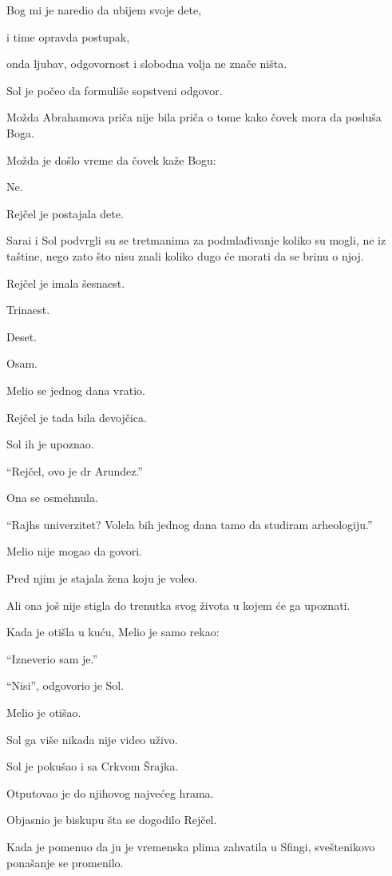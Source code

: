 Bog mi je naredio da ubijem svoje dete,

i time opravda postupak,

onda ljubav, odgovornost i slobodna volja ne znače ništa.

Sol je počeo da formuliše sopstveni odgovor.

Možda Abrahamova priča nije bila priča o tome kako čovek mora da posluša Boga.

Možda je došlo vreme da čovek kaže Bogu:

Ne.

\bigskip

Rejčel je postajala dete.

Sarai i Sol podvrgli su se tretmanima za podmlađivanje koliko su mogli, ne iz taštine, nego zato što nisu znali koliko dugo će morati da se brinu o njoj.

Rejčel je imala šesnaest.

Trinaest.

Deset.

Osam.

Melio se jednog dana vratio.

Rejčel je tada bila devojčica.

Sol ih je upoznao.

``Rejčel, ovo je dr Arundez.''

Ona se osmehnula.

``Rajhs univerzitet? Volela bih jednog dana tamo da studiram arheologiju.''

Melio nije mogao da govori.

Pred njim je stajala žena koju je voleo.

Ali ona još nije stigla do trenutka svog života u kojem će ga upoznati.

Kada je otišla u kuću, Melio je samo rekao:

``Izneverio sam je.''

``Nisi'', odgovorio je Sol.

Melio je otišao.

Sol ga više nikada nije video uživo.

\bigskip

Sol je pokušao i sa Crkvom Šrajka.

Otputovao je do njihovog najvećeg hrama.

Objasnio je biskupu šta se dogodilo Rejčel.

Kada je pomenuo da ju je vremenska plima zahvatila u Sfingi, sveštenikovo ponašanje se promenilo.

